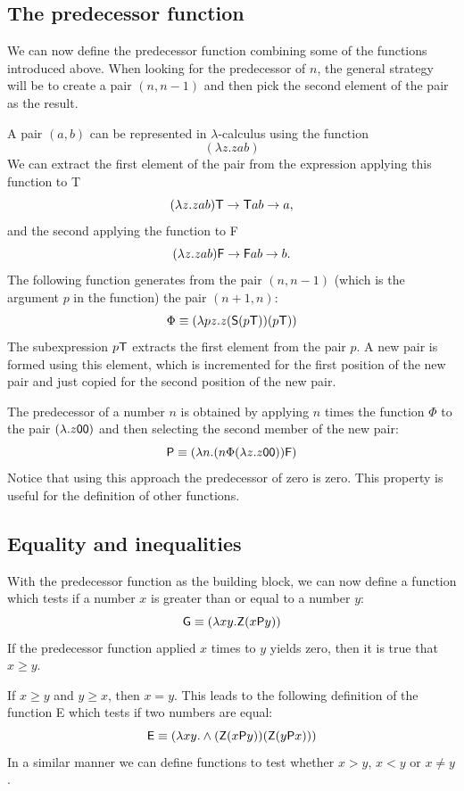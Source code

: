 \documentclass[12pt]{article}
\begin{document}
\subsection{The predecessor function}
We can now define the predecessor function combining some of the functions introduced above. When looking for the predecessor of $n$, the general strategy will be to create a pair $(n,n-1)$ and then pick the second element of the pair as the result. 

A pair $(a,b)$ can be represented in $\lambda$-calculus using the function
$$(\lambda z.zab)$$ We can extract the first element of the pair from the expression applying this function to {\sf T}
$$(\lambda z.zab){\sf T}\rightarrow {\sf T} ab\rightarrow a,$$ and the second applying the function to {\sf F}
$$(\lambda z.zab){\sf F} \rightarrow {\sf F} ab\rightarrow b.$$ 
The following function generates from the pair $(n,n-1)$ (which is the argument $p$ in the function) the pair $(n+1,n)$:
$$\Phi\equiv (\lambda pz.z({\sf S}(p{\sf T}))(p{\sf T}))$$
The subexpression $p{\sf T}$ extracts the first element from the pair $p$. A new pair is formed using this element, which is incremented for the first position of the new pair and just copied for the second position of the new pair.

The predecessor of a number $n$ is obtained by applying $n$ times the function $\Phi$ to the pair $(\lambda.z{\sf 00})$ and then selecting the second member of the new pair:
$${\sf P} \equiv (\lambda n.(n\Phi(\lambda z.z{\sf 00})){\sf F})$$
Notice that using this approach the predecessor of zero is zero. This property is useful for the definition of other functions.


\subsection{Equality and inequalities}
With the predecessor function as the building block, we can now define a function which tests if a number $x$ is greater than or equal to a number $y$:
$${\sf G}\equiv (\lambda xy.{\sf Z} (x{\sf P}y))$$
If the predecessor function applied $x$ times to $y$ yields zero, then it is true that $x\geq y$. 

If $x\geq y$ and $y\geq x$, then $x=y$. This leads to the following definition of the function {\sf E} which tests if  two numbers are equal:
$${\sf E}\equiv(\lambda xy.\wedge({\sf Z}(x{\sf P}y))({\sf Z}(y{\sf P}x)))$$
In a similar manner we can define functions to test whether $x>y$, $x<y$ or $x\neq y$.
\end{document}
